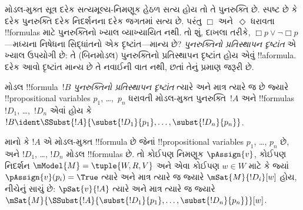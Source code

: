 \documentclass[../../../include/open-logic-section]{subfiles}
\begin{document}


\begin{explain}
મોડલ-મુક્ત સૂત્ર દરેક સત્યમૂલ્ય-નિમણૂક હેઠળ સત્ય હોય
તો તે પુનરુક્તિ છે. સ્પષ્ટ છે કે દરેક પુનરુક્તિ દરેક
નિદર્શનના દરેક જગતમાં સત્ય છે. પરંતુ $\Box$
અને~$\Diamond$ ધરાવતા !!{formula}s માટે પુનરુક્તિનો
ખ્યાલ વ્યાખ્યાયિત નથી. તો શું, દાખલા તરીકે,
$\Box p \lor \lnot \Box p$---મધ્યના નિષેધના સિદ્ધાંતનો
એક દૃષ્ટાંત---માન્ય છે? \emph{પુનરુક્તિનો પ્રતિસ્થાપન દૃષ્ટાંત}
એ ખ્યાલ ઉપયોગી છે: તે (બિનમોડલ) પુનરુક્તિનો
પ્રતિસ્થાપન દૃષ્ટાંત હોય એવું !!a{formula}. દરેક
આવો દૃષ્ટાંત માન્ય છે તે નવાઈની વાત નથી, છતાં
તેનું પ્રમાણ જરૂરી છે.
\end{explain}

\begin{defn}
  મોડલ !!{formula}~$!B$ \emph{પુનરુક્તિનો પ્રતિસ્થાપન દૃષ્ટાંત}
  ત્યારે અને માત્ર ત્યારે જ છે જ્યારે !!{propositional
    variable}s $p_1$, \dots,~$p_n$ ધરાવતી મોડલ-મુક્ત
  પુનરુક્તિ~$!A$ અને !!{formula}s $!D_1$,
  \dots,~$!D_n$ એવાં હોય કે $!B \ident \SSubst{!A}{\subst{!D_1}{p_1},
    \dots, \subst{!D_n}{p_n}}$.
\end{defn}

\begin{lem}
  માનો કે $!A$ એ મોડલ-મુક્ત !!{formula} છે જેનાં !!{propositional
  variable}s $p_1$, \dots, $p_n$ છે, અને $!D_1$, \dots,
  $!D_n$ મોડલ !!{formula}s છે. તો કોઈપણ નિમણૂક $\pAssign{v}$,
  કોઈપણ નિદર્શન $\mModel{M} = \tuple{W, R, V}$ અને એવા કોઈપણ
  $w \in W$ માટે કે જ્યાં $\pAssign{v}(p_i) = \True$ ત્યારે અને માત્ર
  ત્યારે જ જ્યારે $\mSat{M}{!D_i}[w]$ હોય, નીચેનું સાચું છે:
  $\pSat{v}{!A}$ ત્યારે અને માત્ર ત્યારે જ જ્યારે
  $\mSat{M}{\SSubst{!A}{\subst{!D_1}{p_1}, \dots,
      \subst{!D_n}{p_n}}}[w]$.
\end{lem}
\end{document}
